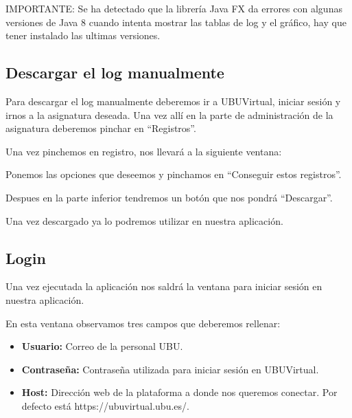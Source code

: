
IMPORTANTE: Se ha detectado que la librería Java FX da errores con algunas versiones de Java 8 cuando intenta mostrar las tablas de log y el gráfico, hay que tener instalado las ultimas versiones.

\subsection{Descargar el log manualmente}

Para descargar el log manualmente deberemos ir a UBUVirtual, iniciar sesión y irnos a la asignatura deseada. Una vez allí en la parte de administración de la asignatura deberemos pinchar en ``Registros''.


Una vez pinchemos en registro, nos llevará a la siguiente ventana:


Ponemos las opciones que deseemos y pinchamos en ``Conseguir estos registros''.


Despues en la parte inferior tendremos un botón que nos pondrá ``Descargar''.


Una vez descargado ya lo podremos utilizar en nuestra aplicación.


\subsection{Login}


Una vez ejecutada la aplicación nos saldrá la ventana para iniciar sesión en nuestra aplicación.


En esta ventana observamos tres campos que deberemos rellenar:

\begin{itemize}
	\tightlist
	\item
	\textbf{Usuario:} Correo de la personal UBU.
	\item
	\textbf{Contraseña:} Contraseña utilizada para iniciar sesión en UBUVirtual.
	\item
	\textbf{Host:} Dirección web de la plataforma a donde nos queremos conectar. Por defecto está https://ubuvirtual.ubu.es/.
\end{itemize}

